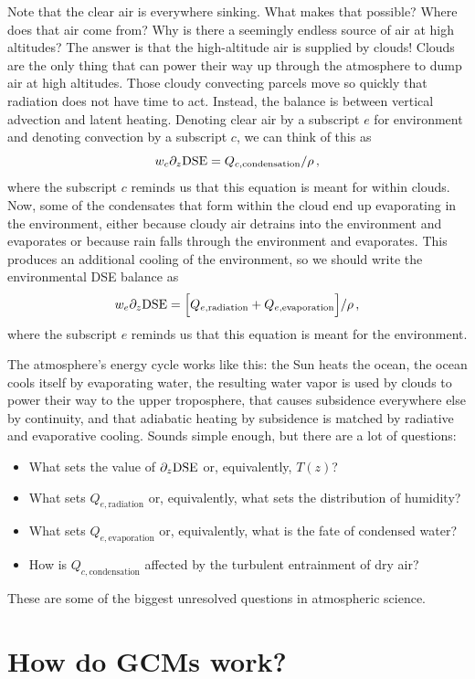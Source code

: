 \documentclass[12pt]{article}
\newcommand{\dse}{{\text{DSE}}}
\begin{document}
Note that the clear air is everywhere sinking.  What makes that possible?  Where does that air come from?  Why is there a seemingly endless source of air at high altitudes?  The answer is that the high-altitude air is supplied by clouds!  Clouds are the only thing that can power their way up through the atmosphere to dump air at high altitudes.  Those cloudy convecting parcels move so quickly that radiation does not have time to act.  Instead, the balance is between vertical advection and latent heating.  Denoting clear air by a subscript $e$ for environment and denoting convection by a subscript $c$, we can think of this as
\[
w_c \ppz \dse = Q_{c,\text{condensation}} / \rho \, ,
\]
where the subscript $c$ reminds us that this equation is meant for within clouds.  Now, some of the condensates that form within the cloud end up evaporating in the environment, either because cloudy air detrains into the environment and evaporates or because rain falls through the environment and evaporates.  This produces an additional cooling of the environment, so we should write the environmental DSE balance as
\[
w_e \ppz \dse{} = \Big[ Q_{e,\text{radiation}} + Q_{e,\text{evaporation}} \Big] / \rho \, ,
\]
where the subscript $e$ reminds us that this equation is meant for the environment.


The atmosphere's energy cycle works like this: the Sun heats the ocean, the ocean cools itself by evaporating water, the resulting water vapor is used by clouds to power their way to the upper troposphere, that causes subsidence everywhere else by continuity, and that adiabatic heating by subsidence is matched by radiative and evaporative cooling.  Sounds simple enough, but there are a lot of questions:
\begin{itemize}
\item What sets the value of $\ppz \dse{}$ or, equivalently, $T(z)$? 
\item What sets $Q_{e,\text{radiation}}$ or, equivalently, what sets the distribution of humidity?
\item What sets $Q_{e,\text{evaporation}}$ or, equivalently, what is the fate of condensed water?
\item How is $Q_{c,\text{condensation}}$ affected by the turbulent entrainment of dry air?
\end{itemize}
These are some of the biggest unresolved questions in atmospheric science.


\section{How do GCMs work?}
\end{document}
